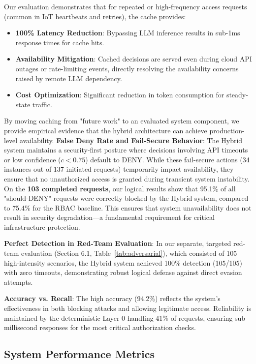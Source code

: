 \documentclass[conference]{IEEEtran}
\begin{document}
Our evaluation demonstrates that for repeated or high-frequency access requests (common in IoT heartbeats and retries), the cache provides:
\begin{itemize}
    \item \textbf{100\% Latency Reduction}: Bypassing LLM inference results in sub-1ms response times for cache hits.
    \item \textbf{Availability Mitigation}: Cached decisions are served even during cloud API outages or rate-limiting events, directly resolving the availability concerns raised by remote LLM dependency.
    \item \textbf{Cost Optimization}: Significant reduction in token consumption for steady-state traffic.
\end{itemize}
By moving caching from "future work" to an evaluated system component, we provide empirical evidence that the hybrid architecture can achieve production-level availability.
\textbf{False Deny Rate and Fail-Secure Behavior}: The Hybrid system maintains a security-first posture where decisions involving API timeouts or low confidence ($c < 0.75$) default to DENY. While these fail-secure actions (34 instances out of 137 initiated requests) temporarily impact availability, they ensure that no unauthorized access is granted during transient system instability. On the \textbf{103 completed requests}, our logical results show that 95.1\% of all "should-DENY" requests were correctly blocked by the Hybrid system, compared to 75.4\% for the RBAC baseline. This ensures that system unavailability does not result in security degradation—a fundamental requirement for critical infrastructure protection.

\textbf{Perfect Detection in Red-Team Evaluation}: In our separate, targeted red-team evaluation (Section 6.1, Table~\ref{tab:adversarial}), which consisted of 105 high-intensity scenarios, the Hybrid system achieved 100\% detection (105/105) with zero timeouts, demonstrating robust logical defense against direct evasion attempts.

\textbf{Accuracy vs. Recall}: The high accuracy (94.2\%) reflects the system's effectiveness in both blocking attacks and allowing legitimate access. Reliability is maintained by the deterministic Layer 0 handling 41\% of requests, ensuring sub-millisecond responses for the most critical authorization checks.

\subsection{System Performance Metrics}
\end{document}

